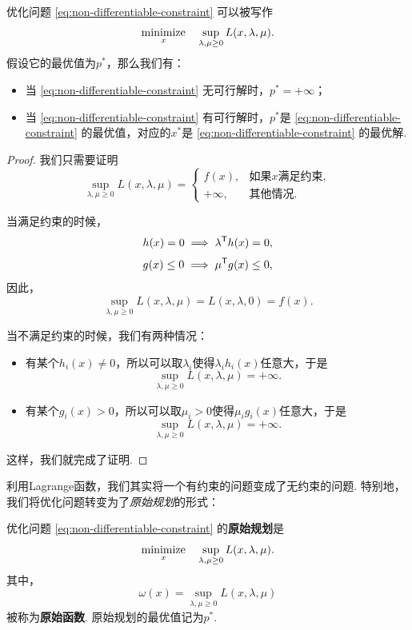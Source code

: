 \begin{proposition}\label{proposition:lagrange-primal}
    优化问题 \eqref{eq:non-differentiable-constraint} 可以被写作
    \[\operatorname*{minimize}_{x}\quad \sup_{\lambda,\mu\geq 0} L(x,\lambda,\mu).\]
    假设它的最优值为$p^*$，那么我们有：
    \begin{itemize}
        \item 当 \eqref{eq:non-differentiable-constraint} 无可行解时，$p^*=+\infty$；
        \item 当 \eqref{eq:non-differentiable-constraint} 有可行解时，$p^*$是 \eqref{eq:non-differentiable-constraint} 的最优值，对应的$x^*$是 \eqref{eq:non-differentiable-constraint} 的最优解.
    \end{itemize}
\end{proposition}
\begin{proof}
    我们只需要证明
    \[\sup_{\lambda,\mu\geq 0} L(x,\lambda,\mu)=\begin{cases}
        f(x),&\text{如果$x$满足约束},\\
        +\infty,&\text{其他情况}.
    \end{cases}\]

    当满足约束的时候，
    \[h(x)=0\implies \lambda^{\mathsf{T}} h(x)=0,\]
    \[g(x)\leq 0\implies \mu^{\mathsf{T}} g(x)\leq 0,\]
    因此，
    \[\sup_{\lambda,\mu\geq 0} L(x,\lambda,\mu)=L(x,\lambda,0)=f(x).\]

    当不满足约束的时候，我们有两种情况：
    \begin{itemize}
        \item 有某个$h_i(x)\neq 0$，所以可以取$\lambda_i$使得$\lambda_i h_i(x)$任意大，于是
        \[\sup_{\lambda,\mu\geq 0} L(x,\lambda,\mu)=+\infty.\]
        \item 有某个$g_i(x)>0$，所以可以取$\mu_i>0$使得$\mu_i g_i(x)$任意大，于是
        \[\sup_{\lambda,\mu\geq 0} L(x,\lambda,\mu)=+\infty.\]
    \end{itemize}
    这样，我们就完成了证明. 
\end{proof}

利用Lagrange函数，我们其实将一个有约束的问题变成了无约束的问题. 特别地，我们将优化问题转变为了\textit{原始规划}的形式：

\begin{definition}[原始规划和原始函数]
    优化问题 \eqref{eq:non-differentiable-constraint} 的\textbf{原始规划}是
    \[\operatorname*{minimize}_{x}\quad \sup_{\lambda,\mu\geq 0} L(x,\lambda,\mu).\]
    其中，
    \[\omega(x)=\sup_{\lambda,\mu\geq 0} L(x,\lambda,\mu)\]
    被称为\textbf{原始函数}. 原始规划的最优值记为$p^*$.
\end{definition}

